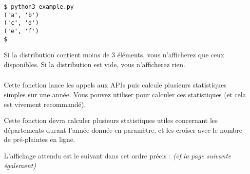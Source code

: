 \lstset{language=sh}
\begin{lstlisting}[frame=single]
$ python3 example.py
('a', 'b')
('c', 'd')
('e', 'f')
$
\end{lstlisting}


\noindent Si la distribution contient moins de 3 éléments, vous n'afficherez que ceux disponibles.
Si la distribution est vide, vous n'afficherez rien.


\subsubsection*{}

\noindent Cette fonction lance les appels aux APIs puis calcule plusieurs statistiques simples sur une année.
Vous pouvez utiliser  pour calculer ces statistiques (et cela est vivement recommandé).


\noindent Cette fonction devra calculer plusieurs statistiques utiles concernant les départements durant l'année donnée en paramètre, et les croiser avec le nombre de pré-plaintes en ligne.




\noindent L'affichage attendu est le suivant dans cet ordre précis : \textit{(cf la page suivante également)}

\smallskip

